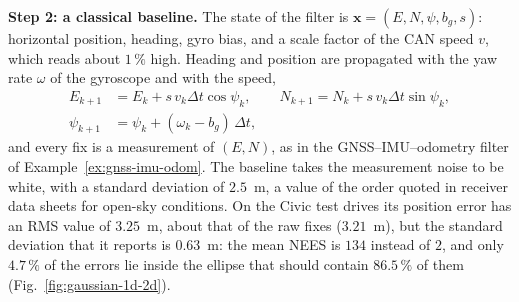\documentclass[graybox,envcountchap]{style/SNmono}
\begin{document}
\textbf{Step 2: a classical baseline.} The state of the filter is $\mathbf{x}=(E,N,\psi,b_g,s)$: horizontal position, heading, gyro bias, and a scale factor of the CAN speed $v$, which reads about $1\,\%$ high. Heading and position are propagated with the yaw rate $\omega$ of the gyroscope and with the speed,
\begin{equation}
\begin{aligned}
E_{k+1}&=E_k+s\,v_k\Delta t\cos\psi_k, \qquad N_{k+1}=N_k+s\,v_k\Delta t\sin\psi_k,\\
\psi_{k+1}&=\psi_k+(\omega_k-b_g)\,\Delta t,
\end{aligned}
\label{eq:c2k-process}
\end{equation}
and every fix is a measurement of $(E,N)$, as in the GNSS--IMU--odometry filter of Example~\ref{ex:gnss-imu-odom}. The baseline takes the measurement noise to be white, with a standard deviation of $2.5$~m, a value of the order quoted in receiver data sheets for open-sky conditions. On the Civic test drives its position error has an RMS value of $3.25$~m, about that of the raw fixes ($3.21$~m), but the standard deviation that it reports is $0.63$~m: the mean NEES is $134$ instead of $2$, and only $4.7\,\%$ of the errors lie inside the ellipse that should contain $86.5\,\%$ of them (Fig.~\ref{fig:gaussian-1d-2d}).
\end{document}
